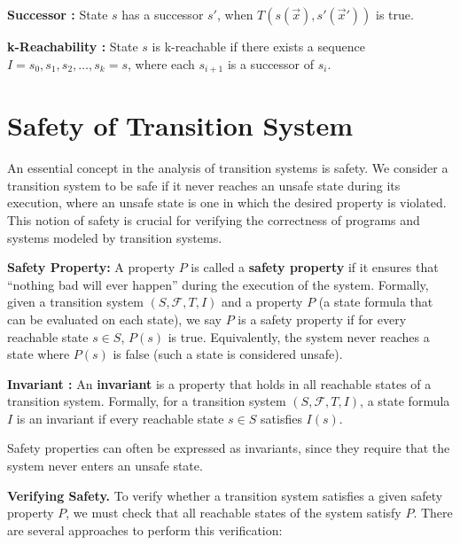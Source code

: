 \begin{definition}
    \textbf{Successor \cite{7886665}:}
    State $s$ has a successor $s'$, when $T(s(\vec{x}), s'(\vec{x}'))$ is true.
\end{definition}

\begin{definition}
    \textbf{k-Reachability \cite{7886665}:}
    State $s$ is k-reachable if there exists a sequence
    $I = s_0, s_1, s_2, \ldots, s_k = s$, where each $s_{i+1}$ is a successor of $s_i$.
\end{definition}

\section{Safety of Transition System}


\noindent An essential concept in the analysis of transition systems is safety. We
consider a transition system to be safe if it never reaches an
unsafe state during its execution, where an unsafe state is one in which
the desired property is violated. This notion of safety is crucial for
verifying the correctness of programs and systems modeled by transition
systems.

\begin{definition}\textbf{Safety Property:} A property $P$ is called a \textbf{safety
property} if it ensures that “nothing bad will ever happen” during the
execution of the system. Formally, given a transition system $(S, \mathcal{F},
T, I)$ and a property $P$ (a state formula that can be evaluated on each
state), we say $P$ is a safety property if for every reachable state $s \in S$,
$P(s)$ is true. Equivalently, the system never reaches a state where $P(s)$ is
false (such a state is considered unsafe). \end{definition}

\begin{definition}\textbf{Invariant \cite{7886665}:} An \textbf{invariant} is a property
that holds in all reachable states of a transition system. Formally, for a
transition system $(S, \mathcal{F}, T, I)$, a state formula $I$ is an invariant if
every reachable state $s \in S$ satisfies $I(s)$. \end{definition}

\noindent Safety properties can often
be expressed as invariants, since they require that the system never enters an
unsafe state.

\vspace{\baselineskip}
\noindent\textbf{Verifying Safety.} To verify whether a transition system satisfies a
given safety property $P$, we must check that all reachable states of the
system satisfy $P$. There are several approaches to perform this verification:


